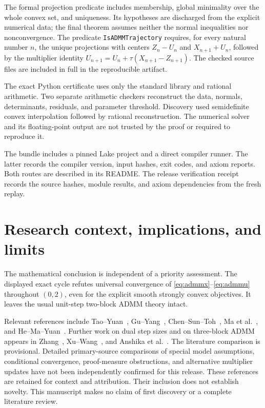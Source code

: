 \documentclass[11pt,a4paper]{article}
\theoremstyle{remark}
\begin{document}
The formal projection predicate includes membership, global minimality over the whole convex set, and uniqueness. Its hypotheses are discharged from the explicit numerical data; the final theorem assumes neither the normal inequalities nor nonconvergence. The predicate \texttt{IsADMMTrajectory} requires, for every natural number $n$, the unique projections with centers $Z_n-U_n$ and $X_{n+1}+U_n$, followed by the multiplier identity $U_{n+1}=U_n+\tau(X_{n+1}-Z_{n+1})$. The checked source files are included in full in the reproducible artifact.



The exact Python certificate uses only the standard library and rational arithmetic. Two separate arithmetic checkers reconstruct the data, normals, determinants, residuals, and parameter threshold. Discovery used semidefinite convex interpolation followed by rational reconstruction. The numerical solver and its floating-point output are not trusted by the proof or required to reproduce it.

The bundle includes a pinned Lake project and a direct compiler runner. The latter records the compiler version, input hashes, exit codes, and axiom reports. Both routes are described in its README. The release verification receipt records the source hashes, module results, and axiom dependencies from the fresh replay.

\section{Research context, implications, and limits}\label{sec:context}
The mathematical conclusion is independent of a priority assessment.
The displayed exact cycle refutes universal convergence of
\eqref{eq:admmx}--\eqref{eq:admmu} throughout $(0,2)$, even for the
explicit smooth strongly convex objectives. It leaves the usual unit-step
two-block ADMM theory intact.

Relevant references include Tao--Yuan~\cite{TaoYuan},
Gu--Yang~\cite{GuYang}, Chen--Sun--Toh~\cite{ChenSunToh},
Ma et al.~\cite{MaEtAl}, and He--Ma--Yuan~\cite{HeMaYuan}. Further work
on dual step sizes and on three-block ADMM appears in Zhang~\cite{Zhang},
Xu--Wang~\cite{XuWang}, and Anshika et al.~\cite{AnshikaEtAl}.
The literature comparison is provisional. Detailed primary-source comparisons
of special model assumptions, conditional convergence, proof-measure
obstructions, and alternative multiplier updates have not been independently
confirmed for this release. These references are retained for context and
attribution. Their inclusion does not establish novelty. This manuscript
makes no claim of first discovery or a complete literature review.
\end{document}
